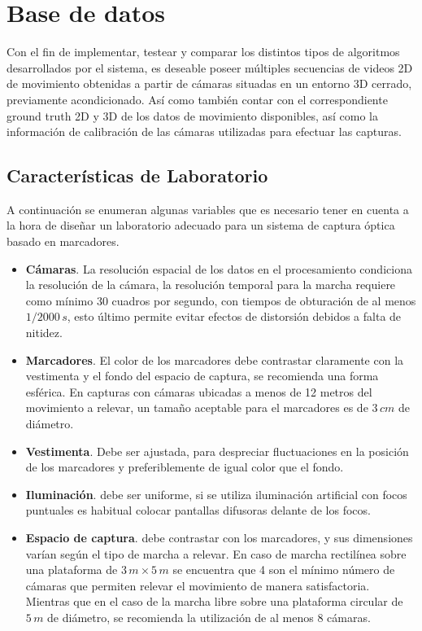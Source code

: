 \section{Base de datos} 
\label{section_base_de_datos}
Con el fin de implementar, testear y comparar los distintos tipos de algoritmos desarrollados por el sistema, es deseable poseer  múltiples secuencias de videos 2D de movimiento obtenidas a partir de cámaras situadas en un entorno 3D cerrado, previamente acondicionado. Así como también contar con el correspondiente ground truth 2D y 3D de los datos de movimiento disponibles, así como la información de calibración de las cámaras utilizadas para efectuar las capturas.

\subsection{Características de Laboratorio}
\label{seccion_Caracteristicas_Laboratorio}
A continuación se enumeran algunas variables que es necesario tener en cuenta a la hora de diseñar un laboratorio adecuado para un sistema de captura óptica basado en marcadores. 

\begin{itemize}
\item \textbf{Cámaras}. La resolución espacial de los datos en el procesamiento condiciona la resolución de la cámara, la resolución temporal para la marcha requiere como mínimo 30 cuadros por segundo, con tiempos de obturación de al menos $1/2000\, s$, esto último permite evitar efectos de distorsión debidos a falta de nitidez.
\item \textbf{Marcadores}. El color de los  marcadores debe contrastar claramente con la vestimenta y el fondo del espacio de captura, se recomienda una forma esférica. En capturas con cámaras ubicadas a menos de 12 metros del movimiento a relevar, un tamaño aceptable para el marcadores es de $3\,cm$ de diámetro.
\item \textbf{Vestimenta}. Debe ser ajustada, para despreciar fluctuaciones en la posición de los marcadores y preferiblemente de igual color que el fondo. 
\item \textbf{Iluminación}. debe ser uniforme, si se utiliza iluminación artificial con focos puntuales es habitual colocar pantallas difusoras delante de los focos.
\item \textbf{Espacio de captura}. debe contrastar con los marcadores, y sus dimensiones varían según el tipo de marcha a relevar. En caso de marcha rectilínea sobre una plataforma de $3\,m \times 5 \,m$ se encuentra que 4 son el mínimo número de cámaras que permiten relevar el movimiento de manera satisfactoria. Mientras  que en el caso de la marcha libre sobre una plataforma circular de $5\,m$ de diámetro, se recomienda la utilización de al menos 8 cámaras.
\end{itemize}

